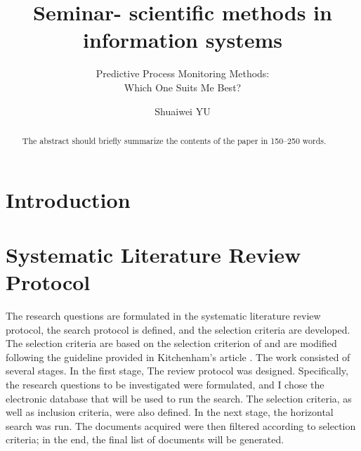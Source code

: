 \documentclass[runningheads]{llncs}
\begin{document}
	\title{Seminar- scientific methods in information systems}
	\subtitle{Predictive Process Monitoring Methods:\\ Which One Suits Me Best?}
	\author{Shuaiwei YU  }
	\maketitle
	
	\begin{abstract}
		The abstract should briefly summarize the contents of the paper in
		150--250 words.

	\end{abstract}
	
	\section{Introduction}
	
	
	\section{Systematic Literature Review Protocol}
		The research questions are formulated in the systematic literature review protocol, the search protocol is defined, and the selection criteria are developed. The selection criteria are based on the selection criterion of \cite{ref1} and are modified following the guideline provided in Kitchenham's article \cite{ref2}. The work consisted of several stages. In the first stage, The review protocol was designed. Specifically, the research questions to be investigated were formulated, and I chose the electronic database that will be used to run the search. The selection criteria, as well as inclusion criteria, were also defined. In the next stage, the horizontal search was run. The documents acquired were then filtered according to selection criteria; in the end, the final list of documents will be generated.
		
\end{document}
